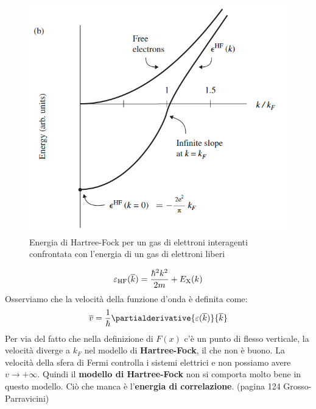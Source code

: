 \begin{figure}[!ht]
    \centering
    \includegraphics[scale=0.6]{images/energyjellium.png}
    \caption{Energia di Hartree-Fock per un gas di elettroni interagenti confrontata con l'energia di un gas di elettroni liberi}
    \label{fig:energyjellium}
\end{figure}
\begin{equation*}
    \varepsilon_{\text{HF}}(\overline k)=\frac{\hbar^2k^2}{2m}+E_{\text X}(k)
\end{equation*}
Osserviamo che la velocità della funzione d'onda è definita come:
\begin{equation*}
    \overline v = \frac{1}{\hbar}\partialderivative{\varepsilon(\overline k)}{\overline k}
\end{equation*}
Per via del fatto che nella definizione di $F(x)$ c'è un punto di flesso verticale, la velocità diverge a $k_F$ nel modello di \textbf{Hartree-Fock}, il che non è buono. La velocità della sfera di Fermi controlla i sistemi elettrici e non possiamo avere $v \rightarrow +\infty$. Quindi il \textbf{modello di Hartree-Fock} non si comporta molto bene in questo modello. Ciò che manca è l'\textbf{energia di correlazione}. (pagina 124 Grosso-Parravicini)


